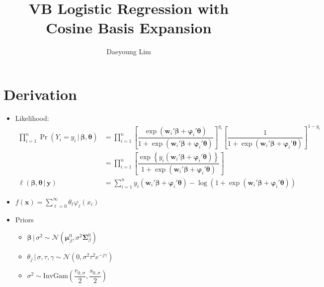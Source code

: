 \documentclass[review]{elsarticle}
\begin{document}
\begin{frontmatter}

\title{VB Logistic Regression with Cosine Basis Expansion}
\author{Daeyoung Lim}


\end{frontmatter}

\linenumbers
\section{Derivation}
\begin{itemize}
  \item Likelihood:
  \begin{align}
    \prod_{i=1}^{n}\Pr\left(Y_{i}=y_{i}\,|\,\bm{\beta},\bm{\theta}\right) &= \prod_{i=1}^{n}\left[\dfrac{\exp\left(\mathbf{w}_{i}'\bm{\beta}+\bm{\varphi}_{i}'\bm{\theta}\right)}{1+\exp\left(\mathbf{w}_{i}'\bm{\beta}+\bm{\varphi}_{i}'\bm{\theta}\right)}\right]^{y_{i}}\left[\dfrac{1}{1+\exp\left(\mathbf{w}_{i}'\bm{\beta}+\bm{\varphi}_{i}'\bm{\theta}\right)}\right]^{1-y_{i}}\\
    &= \prod_{i=1}^{n}\left[\dfrac{\exp\left\{y_{i}\left(\mathbf{w}_{i}'\bm{\beta}+\bm{\varphi}_{i}'\bm{\theta}\right) \right\}}{1+\exp\left(\mathbf{w}_{i}'\bm{\beta}+\bm{\varphi}_{i}'\bm{\theta}\right)}\right]\\
    \ell\left(\bm{\beta},\bm{\theta}\,|\,\mathbf{y}\right) &= \sum_{i=1}^{n}y_{i}\left(\mathbf{w}_{i}'\bm{\beta}+\bm{\varphi}_{i}'\bm{\theta}\right)-\log\left(1+\exp\left(\mathbf{w}_{i}'\bm{\beta}+\bm{\varphi}_{i}'\bm{\theta}\right)\right)
  \end{align}
  \item $f(\mathbf{x})=\displaystyle \sum_{\ell=0}^{\infty} \theta_{\ell}\varphi_{\ell}\left(x_{i}\right)$
  \item Priors
  \begin{itemize}
    \item $\bm{\beta}\,|\,\sigma^{2}\sim\mathcal{N}\left(\bm{\mu}_{\beta}^{0},\sigma^{2}\bm{\Sigma}_{\beta}^{0}\right)$
    \item $\theta_{j}\,|\,\sigma,\tau,\gamma \sim \mathcal{N}\left(0,\sigma^{2}\tau^{2}e^{-j\gamma}\right)$
    \item $\sigma^{2} \sim \mathrm{InvGam}\left(\dfrac{r_{0,\sigma}}{2},\dfrac{s_{0,\sigma}}{2}\right)$

\end{itemize}
\end{itemize}
\end{document}
